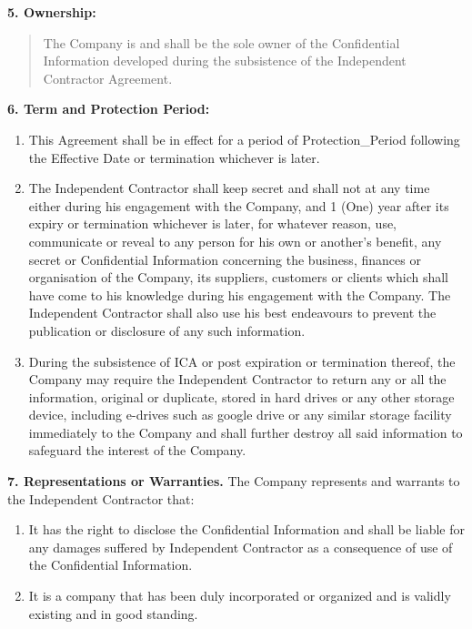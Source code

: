 \documentclass[12pt]{article}
\begin{document}
\vspace{0.5em}
\noindent
\textbf{5. Ownership:}
\begin{quote}
    The Company is and shall be the sole owner of the Confidential Information developed during the subsistence of the Independent Contractor Agreement.
\end{quote}

\vspace{0.5em}
\noindent
\textbf{6. Term and Protection Period:}
\begin{enumerate}
    \item[i.] This Agreement shall be in effect for a period of {{Protection_Period}} following the Effective Date or termination whichever is later.
    \item[ii.] The Independent Contractor shall keep secret and shall not at any time either during his engagement with the Company, and 1 (One) year after its expiry or termination whichever is later, for whatever reason, use, communicate or reveal to any person for his own or another's benefit, any secret or Confidential Information concerning the business, finances or organisation of the Company, its suppliers, customers or clients which shall have come to his knowledge during his engagement with the Company. The Independent Contractor shall also use his best endeavours to prevent the publication or disclosure of any such information.
    \item[iii.] During the subsistence of ICA or post expiration or termination thereof, the Company may require the Independent Contractor to return any or all the information, original or duplicate, stored in hard drives or any other storage device, including e-drives such as google drive or any similar storage facility immediately to the Company and shall further destroy all said information to safeguard the interest of the Company.
\end{enumerate}

\vspace{0.5em}
\noindent
\textbf{7. Representations or Warranties.} The Company represents and warrants to the Independent Contractor that:
\begin{enumerate}
    \item[i.] It has the right to disclose the Confidential Information and shall be liable for any damages suffered by Independent Contractor as a consequence of use of the Confidential Information.
    \item[ii.] It is a company that has been duly incorporated or organized and is validly existing and in good standing.
\end{enumerate}
\end{document}
